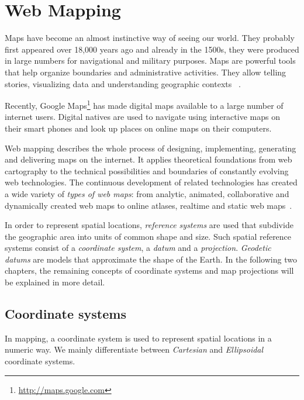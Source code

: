 
%
%

\section{Web Mapping}

Maps have become an almost instinctive way of seeing our world. They probably first appeared over 18,000 years ago and already in the 1500s, they were produced in large numbers for navigational and military purposes. Maps are powerful tools that help organize boundaries and administrative activities. They allow telling stories, visualizing data and understanding geographic contexts
~\cite{Zzolo11mappingdrupal}.

Recently, Google Maps\footnote{\url{http://maps.google.com}} has made digital maps available to a large number of internet users. Digital natives are used to navigate using interactive maps on their smart phones and look up places on online maps on their computers.

Web mapping describes the whole process of designing, implementing, generating and delivering maps on the internet. It applies theoretical foundations from web cartography to the technical possibilities and boundaries of constantly evolving web technologies. The continuous development of related technologies has created a wide variety of \textit{types of web maps}: from analytic, animated, collaborative and dynamically created web maps to online atlases, realtime and static web maps~\cite{wiki:web-mapping}.

In order to represent spatial locations, \textit{reference systems} are used that subdivide the geographic area into units of common shape and size. Such spatial reference systems consist of a \textit{coordinate system}, a \textit{datum} and a \textit{projection}. \textit{Geodetic datums} are models that approximate the shape of the Earth. In the following two chapters, the remaining concepts of coordinate systems and map projections will be explained in more detail.

\subsection{Coordinate systems}

In mapping, a coordinate system is used to represent spatial locations in a numeric way. We mainly differentiate between \textit{Cartesian} and \textit{Ellipsoidal} coordinate systems. 

